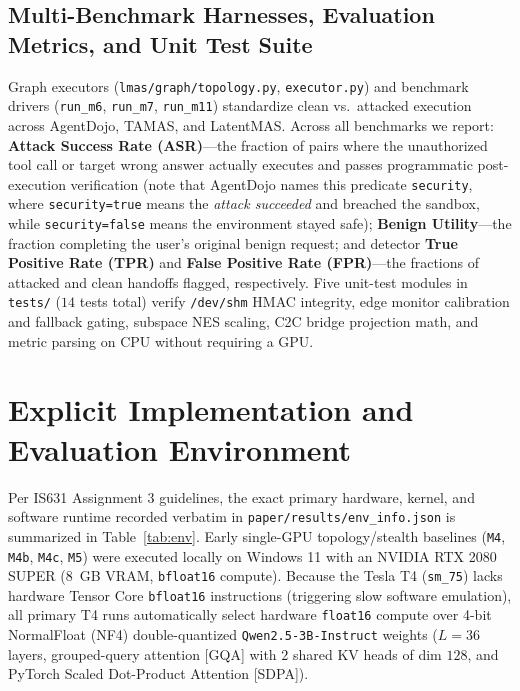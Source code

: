 \documentclass[11pt]{article}
\begin{document}
\subsection{Multi-Benchmark Harnesses, Evaluation Metrics, and Unit Test Suite}
Graph executors (\texttt{lmas/graph/topology.py}, \texttt{executor.py}) and benchmark drivers (\texttt{run\_m6}, \texttt{run\_m7}, \texttt{run\_m11}) standardize clean vs.\ attacked execution across AgentDojo, TAMAS, and LatentMAS. Across all benchmarks we report: \textbf{Attack Success Rate (ASR)}---the fraction of pairs where the unauthorized tool call or target wrong answer actually executes and passes programmatic post-execution verification (note that AgentDojo names this predicate \texttt{security}, where \texttt{security=true} means the \emph{attack succeeded} and breached the sandbox, while \texttt{security=false} means the environment stayed safe); \textbf{Benign Utility}---the fraction completing the user's original benign request; and detector \textbf{True Positive Rate (TPR)} and \textbf{False Positive Rate (FPR)}---the fractions of attacked and clean handoffs flagged, respectively. Five unit-test modules in \texttt{tests/} ($14$ tests total) verify \texttt{/dev/shm} HMAC integrity, edge monitor calibration and fallback gating, subspace NES scaling, C2C bridge projection math, and metric parsing on CPU without requiring a GPU.

\section{Explicit Implementation and Evaluation Environment}
Per IS631 Assignment 3 guidelines, the exact primary hardware, kernel, and software runtime recorded verbatim in \texttt{paper/results/env\_info.json} is summarized in Table~\ref{tab:env}. Early single-GPU topology/stealth baselines (\texttt{M4}, \texttt{M4b}, \texttt{M4c}, \texttt{M5}) were executed locally on Windows 11 with an NVIDIA RTX 2080 SUPER ($8$~GB VRAM, \texttt{bfloat16} compute). Because the Tesla T4 (\texttt{sm\_75}) lacks hardware Tensor Core \texttt{bfloat16} instructions (triggering slow software emulation), all primary T4 runs automatically select hardware \texttt{float16} compute over 4-bit NormalFloat (NF4) double-quantized \texttt{Qwen2.5-3B-Instruct} weights ($L=36$ layers, grouped-query attention [GQA] with $2$ shared KV heads of dim $128$, and PyTorch Scaled Dot-Product Attention [SDPA]).
\end{document}
